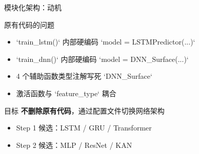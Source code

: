 \documentclass[aspectratio=169]{beamer}
\begin{document}
\begin{frame}{模块化架构：动机}
\begin{block}{原有代码的问题}
\begin{itemize}
    \item `train\_lstm()` 内部硬编码 `model = LSTMPredictor(...)`
    \item `train\_dnn()` 内部硬编码 `model = DNN\_Surface(...)`
    \item 4 个辅助函数类型注解写死 `DNN\_Surface`
    \item 激活函数与 `feature\_type` 耦合
\end{itemize}
\end{block}

\vspace{0.3cm}
\begin{block}{目标}
\textbf{不删除原有代码}，通过配置文件切换网络架构
\begin{itemize}
    \item Step 1 候选：LSTM / GRU / Transformer
    \item Step 2 候选：MLP / ResNet / KAN
\end{itemize}
\end{block}
\end{frame}
\end{document}
